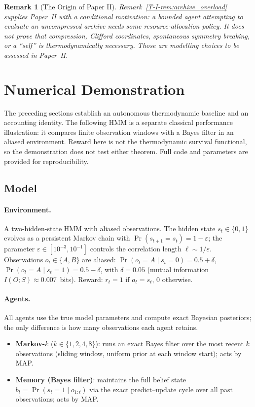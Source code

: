 \documentclass[12pt,a4paper,openany]{book}
\newtheorem{remark}[theorem]{Remark}
\begin{document}
\begin{remark}[The Origin of Paper II]
\label{T-I-rem:paper_II}
Remark~\ref{T-I-rem:archive_overload} supplies Paper~II with a conditional
motivation: a bounded agent attempting to evaluate an uncompressed
archive needs some resource-allocation policy.  It does not prove that
compression, Clifford coordinates, spontaneous symmetry breaking, or a
``self'' is thermodynamically necessary.  Those are modelling choices
to be assessed in Paper~II.
\end{remark}

\section{Numerical Demonstration}
\label{T-I-sec:numerical}

The preceding sections establish an autonomous thermodynamic baseline
and an accounting identity.  The following HMM is a separate classical
performance illustration: it compares finite observation windows with
a Bayes filter in an aliased environment.  Reward here is not the
thermodynamic survival functional, so the demonstration does not test
either theorem.
Full code and parameters are provided for reproducibility.

\subsection{Model}
\label{T-I-subsec:demo_model}

\paragraph{Environment.}
A two-hidden-state HMM with aliased observations.
The hidden state $s_t \in \{0,1\}$ evolves as a persistent
Markov chain with $\Pr(s_{t+1} = s_t) = 1 - \varepsilon$;
the parameter $\varepsilon \in [10^{-3}, 10^{-1}]$ controls
the correlation length $\ell \sim 1/\varepsilon$.
Observations $o_t \in \{A, B\}$ are aliased:
$\Pr(o_t = A \mid s_t = 0) = 0.5 + \delta$,
$\Pr(o_t = A \mid s_t = 1) = 0.5 - \delta$,
with $\delta = 0.05$ (mutual information
$I(O; S) \approx 0.007$~bits).
Reward: $r_t = 1$ if $a_t = s_t$, $0$ otherwise.

\paragraph{Agents.}
All agents use the true model parameters and compute
exact Bayesian posteriors; the only difference is how many
observations each agent retains.
\begin{itemize}
\item \textbf{Markov-$k$} ($k \in \{1,2,4,8\}$): runs
  an exact Bayes filter over the most recent $k$
  observations (sliding window, uniform prior at each
  window start); acts by MAP.
\item \textbf{Memory (Bayes filter)}: maintains the full
  belief state $b_t = \Pr(s_t = 1 \mid o_{1:t})$ via the
  exact predict--update cycle over all past observations;
  acts by MAP.
\end{itemize}
\end{document}
